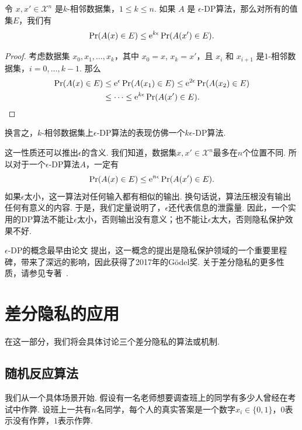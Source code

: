 \begin{proposition}[群体隐私]\label{proposition:group-privacy}
    令 $x, x' \in \mathcal X^n$ 是$k$-相邻数据集，$1 \leq k \leq n$. 如果 $A$ 是 $\epsilon$-DP算法，那么对所有的值集$E$，我们有
    \[
    \Pr(A(x) \in E) \leq \mathrm{e}^{k\epsilon}\Pr(A(x') \in E).
    \]
\end{proposition}
\begin{proof}
    考虑数据集 $x_0, x_1, \dots , x_k$，其中 $x_0 = x$, $x_k = x'$，且 $x_i$ 和 $x_{i+1}$ 是$1$-相邻数据集，$i = 0, \dots, k-1$. 那么
    \[
    \begin{aligned}
    \Pr(A(x) \in E) &\leq \mathrm{e}^{\epsilon}\Pr(A(x_1) \in E) \leq \mathrm{e}^{2\epsilon}\Pr(A(x_2) \in E)\\
    &\leq \dots \leq \mathrm{e}^{k\epsilon}\Pr(A(x') \in E).
    \end{aligned}
    \]
\end{proof}

换言之，$k$-相邻数据集上$\epsilon$-DP算法的表现仿佛一个$k\epsilon$-DP算法. 

这一性质还可以推出$\epsilon$的含义. 我们知道，数据集$x, x' \in \mathcal X^n$最多在$n$个位置不同. 所以对于一个$\epsilon$-DP算法$A$，一定有
        \[
        \Pr(A(x) \in E) \leq \mathrm{e}^{n\epsilon}\Pr(A(x') \in E).
        \]
如果$\epsilon$太小，这一算法对任何输入都有相似的输出. 换句话说，算法压根没有输出任何有意义的内容. 于是，我们定量说明了，$\epsilon$还代表信息的泄露量. 因此，一个实用的DP算法不能让$\epsilon$太小，否则输出没有意义；也不能让$\epsilon$太大，否则隐私保护效果不好.

\begin{remark}
    $\epsilon$-DP的概念最早由论文 \cite{dworkCalibratingNoiseSensitivity2006} 提出，这一概念的提出是隐私保护领域的一个重要里程碑，带来了深远的影响，因此获得了2017年的Gödel奖. 关于差分隐私的更多性质，请参见专著~\cite{dworkAlgorithmicFoundationsDifferential2013}.
\end{remark}

\section{差分隐私的应用}
在这一部分，我们将会具体讨论三个差分隐私的算法或机制. 

\subsection{随机反应算法}
我们从一个具体场景开始. 假设有一名老师想要调查班上的同学有多少人曾经在考试中作弊. 设班上一共有$n$名同学，每个人的真实答案是一个数字$x_i \in \{0,1\}$，$0$表示没有作弊，$1$表示作弊. 

